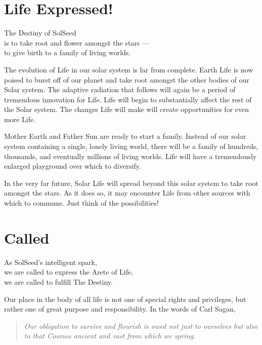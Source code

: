 \documentclass[ebook,12pt,openany,twoside]{memoir}
\newcommand{\tab}{\hspace*{2em}}
\newcommand{\imagefacingchapter}[1]{
  \cleartoverso
  \clearpage \null
  \thispagestyle{cleared}
  \AddToShipoutPictureBG*{%
    \AtStockLowerLeft{%
      \texttt{[image: \#1]}
    }
  }
  \clearpage
}
\begin{document}
\imagefacingchapter{images/MotherEarthFatherSun}
\chapter{Life Expressed!}

\setlength\epigraphwidth{3.2in}
\epigraph{
  The Destiny of SolSeed\\
  is to take root and flower amongst the stars ---\\
  \tab to give birth to a family of living worlds.
}{}

\noindent The evolution of Life in our solar system is far from complete. Earth
Life is now poised to burst off of our planet and take root amongst the other
bodies of our Solar system. The adaptive radiation that follows will again be a
period of tremendous innovation for Life. Life will begin to substantially
affect the rest of the Solar system. The changes Life will make will create
opportunities for even more Life.

Mother Earth and Father Sun are ready to start a family. Instead of our solar
system containing a single, lonely living world, there will be a family of
hundreds, thousands, and eventually millions of living worlds. Life will have a
tremendously enlarged playground over which to diversify.

In the very far future, Solar Life will spread beyond this solar system to take
root amongst the stars. As it does so, it may encounter Life from other sources
with which to commune.  Just think of the possibilities!







\imagefacingchapter{images/TakeRootAmongstTheStars-comp}
\chapter{Called}

\setlength\epigraphwidth{3.2in}
\epigraph{
  As SolSeed's intelligent spark,\\
  \tab we are called to express the Arete of Life,\\
  \tab we are called to fulfill The Destiny.
}{}

\noindent Our place in the body of all life is not one of special rights and
privileges, but rather one of great purpose and responsibility. In the words of
Carl Sagan,

\begin{quote}
\em
Our obligation to survive and flourish is owed not just to ourselves but also
to that Cosmos ancient and vast from which we spring.
\end{quote}
\end{document}
